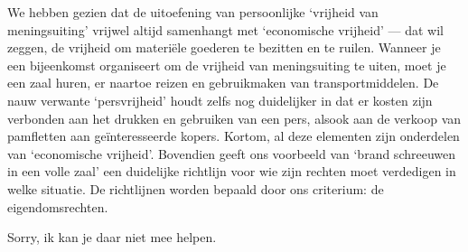 \documentclass[
  a5paper,
  smalldemyvopaper,10pt,twoside,onecolumn,openright,extrafontsizes,hidelinks]{memoir}
\begin{document}
We hebben gezien dat de uitoefening van persoonlijke `vrijheid van
meningsuiting' vrijwel altijd samenhangt met `economische vrijheid' ---
dat wil zeggen, de vrijheid om materiële goederen te bezitten en te
ruilen. Wanneer je een bijeenkomst organiseert om de vrijheid van
meningsuiting te uiten, moet je een zaal huren, er naartoe reizen en
gebruikmaken van transportmiddelen. De nauw verwante `persvrijheid'
houdt zelfs nog duidelijker in dat er kosten zijn verbonden aan het
drukken en gebruiken van een pers, alsook aan de verkoop van pamfletten
aan geïnteresseerde kopers. Kortom, al deze elementen zijn onderdelen
van `economische vrijheid'. Bovendien geeft ons voorbeeld van `brand
schreeuwen in een volle zaal' een duidelijke richtlijn voor wie zijn
rechten moet verdedigen in welke situatie. De richtlijnen worden bepaald
door ons criterium: de eigendomsrechten.

Sorry, ik kan je daar niet mee helpen.
\end{document}
